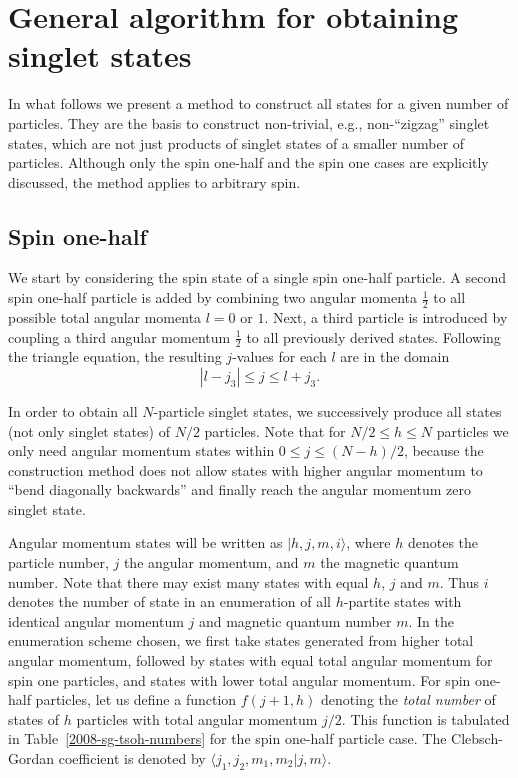 \documentclass[rmp,amsfonts,showpacs,showkeys,preprint]{revtex4}
\begin{document}
\section{General algorithm for obtaining singlet states}



In what follows we present a method to construct all states for a given
number of particles. They are the basis to construct non-trivial,
e.g., non-``zigzag''  singlet states, which are not just
products of singlet states of a smaller number of particles.
Although only the spin one-half and the spin one cases are
explicitly discussed, the method applies to arbitrary spin.


\subsection{Spin one-half}

We start by considering the spin state of a single spin one-half particle. A second spin one-half particle is added by
combining two angular momenta $\frac{1}{2}$ to all possible total
angular momenta $l=0$ or $1$. Next, a third particle is introduced
by coupling a third angular momentum $\frac{1}{2}$ to all
previously derived states. Following the triangle equation, the
resulting $j$-values for each $l$ are in the domain
\begin{equation}
|l-j_3|\leq  j\leq l+j_3.
\end{equation}

In order to obtain all $N$-particle singlet states, we
successively produce all states (not only singlet states) of
$N/2$ particles. Note that for $N/2\leq
h\leq N$ particles we only need angular momentum states within
$0\leq j\leq (N-h)/2$, because the construction method does not allow states with higher angular momentum to
``bend diagonally backwards'' and finally reach the angular momentum zero singlet state.

Angular momentum states will be written as
$|h,j,m,i\rangle$, where $h$ denotes the particle number, $j$ the
angular momentum, and $m$ the magnetic quantum number.
Note that there may exist many states with equal $h$, $j$ and $m$.
Thus $i$ denotes the number
of state in an enumeration of all $h$-partite states with identical angular momentum $j$ and magnetic quantum number $m$.
In the enumeration scheme chosen, we first take states generated from higher total angular momentum,
followed by states with equal total angular momentum for spin one particles, and states with lower  total angular momentum.
For spin one-half particles, let us define a function $f(j+1,h)$ denoting the {\em total number} of
states of $h$ particles with total angular momentum $j/2$.
This function is
tabulated in Table~\ref{2008-sg-tsoh-numbers}
for the spin one-half particle case.
The Clebsch-Gordan coefficient is denoted by
$\langle j_1,j_2,m_1,m_2|j,m\rangle$.
\end{document}
